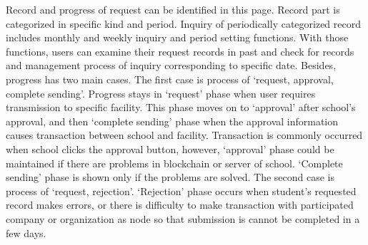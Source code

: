 \documentclass[conference]{IEEEtran}
\begin{document}
\begin{enumerate}
\begin{enumerate}
         Record and progress of request can be identified in this page. Record part is categorized in specific kind and period. Inquiry of periodically categorized record includes monthly and weekly inquiry and period setting functions. With those functions, users can examine their request records in past and check for records and management process of inquiry corresponding to specific date. Besides,  progress has two main cases. The first case is process of ‘request, approval, complete sending’. Progress stays in ‘request’ phase when user requires transmission to specific facility. This phase moves on to ‘approval’ after school’s approval, and then ‘complete sending’ phase when the approval information causes transaction between school and facility. Transaction is commonly occurred when school clicks the approval button, however, ‘approval’ phase could be maintained if there are problems in blockchain or server of school. ‘Complete sending’ phase is shown only if the problems are solved. The second case is process of ‘request, rejection’. ‘Rejection’ phase occurs when student’s requested record makes errors, or there is difficulty to make transaction with participated company or organization as node so that submission is cannot be completed in a few days. \\
    \end{enumerate}
    

\end{enumerate}
\end{document}
